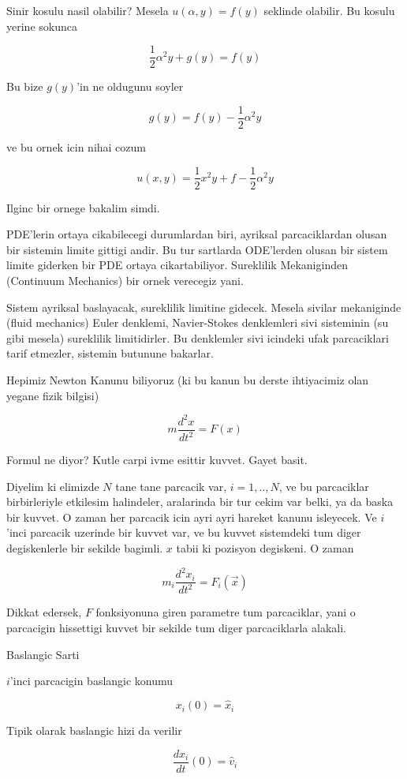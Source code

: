 \documentclass[12pt,fleqn]{article}
\begin{document}
Sinir kosulu nasil olabilir? Mesela $u(\alpha,y) = f(y)$ seklinde
olabilir. Bu kosulu yerine sokunca

\[ \frac{1}{2}\alpha^2 y + g(y) = f(y) \]

Bu bize $g(y)$'in ne oldugunu soyler

\[ g(y)  = f(y) - \frac{1}{2}\alpha^2 y \]

ve bu ornek icin nihai cozum

\[ u(x,y) = \frac{1}{2}x^2y + f - \frac{1}{2}\alpha^2 y \]

Ilginc bir ornege bakalim simdi. 

PDE'lerin ortaya cikabilecegi durumlardan biri, ayriksal parcaciklardan
olusan bir sistemin limite gittigi andir. Bu tur sartlarda ODE'lerden
olusan bir sistem limite giderken bir PDE ortaya cikartabiliyor. Sureklilik
Mekaniginden (Continuum Mechanics) bir ornek verecegiz yani.

Sistem ayriksal baslayacak, sureklilik limitine gidecek. Mesela sivilar
mekaniginde (fluid mechanics) Euler denklemi, Navier-Stokes denklemleri
sivi sisteminin (su gibi mesela) sureklilik limitidirler. Bu denklemler
sivi icindeki ufak parcaciklari tarif etmezler, sistemin butunune
bakarlar. 

Hepimiz Newton Kanunu biliyoruz (ki bu kanun bu derste ihtiyacimiz olan
yegane fizik bilgisi)

\[ m \frac{d^2x}{dt^2} = F(x) \]

Formul ne diyor? Kutle carpi ivme esittir kuvvet. Gayet basit.

Diyelim ki elimizde $N$ tane tane parcacik var, $i=1,..,N$, ve bu
parcaciklar birbirleriyle etkilesim halindeler, aralarinda bir tur cekim
var belki, ya da baska bir kuvvet. O zaman her parcacik icin ayri ayri
hareket kanunu isleyecek. Ve $i$'inci parcacik uzerinde bir kuvvet var, ve
bu kuvvet sistemdeki tum diger degiskenlerle bir sekilde bagimli. $x$ tabii
ki pozisyon degiskeni. O zaman

\[ m_i \frac{d^2x_i}{dt^2} = F_i(\vec{x}) \]

Dikkat edersek, $F$ fonksiyonuna giren parametre tum parcaciklar, yani o
parcacigin hissettigi kuvvet bir sekilde tum diger parcaciklarla alakali. 

Baslangic Sarti

$i$'inci parcacigin baslangic konumu

\[ x_i(0) = \hat{x}_i \]

Tipik olarak baslangic hizi da verilir

\[ \frac{dx_i}{dt}(0) = \hat{v}_i \]
\end{document}
